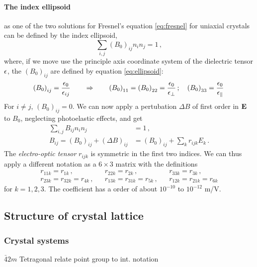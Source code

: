 \paragraph{The index ellipsoid} 
as one of the two solutions for Fresnel's equation 
\eqref{eq:fresnel} for uniaxial crystals can be defined by the 
index ellipsoid, 
\begin{equation}
    \sum\limits_{i, j} {(B_0)}_{ij} n_i n_j = 1 \, ,
\end{equation}
where, if we move use the principle axis coordinate system of 
the dielectric tensor $\epsilon$, 
the ${(B_0)}_{ij}$ are defined by equation \eqref{eq:ellipsoid}:
\begin{equation}
    {(B_0)}_{ij} = \frac{\epsilon_0}{\epsilon_{ij}} 
     \qquad   \Rightarrow \qquad 
        {(B_0)}_{11} = {(B_0)}_{22} = \frac{\epsilon_0}{\epsilon_\perp}\, ; \quad
        {(B_0)}_{33} = \frac{\epsilon_0}{\epsilon_\parallel}\, 
\end{equation}
For $i \neq j$, $(B_0)_{ij} = 0$. 
We can now apply a pertubation $\Delta B$ 
of first order in $\mathbf{E}$ to $B_0$,  
neglecting photoelastic effects, and get
~\cite{sauter1996nonlinear}
\begin{align}
    \sum\limits_{i, j} B_{ij} n_i n_j &= 1 \, ,
    \label{eq:ellipsoid_pertubed} \\
    B_{ij} = (B_0)_{ij} + (\Delta B)_{ij} &= (B_0)_{ij} + \sum\limits_{k} r_{ijk}E_k \, .
    \label{eq:B_ij}
\end{align}
The \emph{electro-optic tensor} $r_{ijk}$ is symmetric in the first two indices.
We can thus apply a different notation as a $6 \times 3$ matrix with the definitions 
\begin{align}
    &r_{11k} = r_{1k}\, ,&
    &r_{22k} = r_{2k}\, ,&
    &r_{33k} = r_{3k}\, ,& \nonumber \\
    &r_{23k} = r_{32k} = r_{4k}\, ,& 
    &r_{13k} = r_{31k} = r_{5k}\, ,&
    &r_{12k} = r_{21k} = r_{6k} &
    \label{eq:notation}
\end{align}
for $k = 1, 2, 3$. The coefficient has a order of about 
$10^{-10}$ to $10^{-12}$ m/V.~\cite{sauter1996nonlinear}


\subsection{Structure of crystal lattice}


\subsubsection{Crystal systems}
$\bar{4}2m$ Tetragonal
relate point group to int. notation



